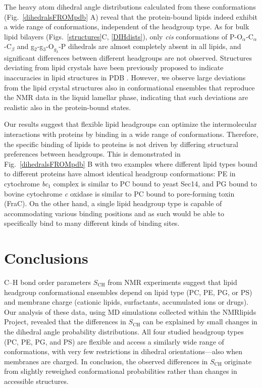 \documentclass[journal=jpcbfk,manuscript=article]{achemso}
\begin{document}
The heavy atom dihedral angle distributions calculated from these conformations 
(Fig.~\ref{dihedralsFROMpdb} A) reveal that the protein-bound lipids indeed exhibit a wide
range of conformations, independent of the headgroup type.
As for bulk lipid bilayers (Figs.~\ref{structures}C, \ref{DIHdists}), only {\it cis} conformations
of P-O$_\alpha$-C$_\alpha$-C$_\beta$ and g$_2$-g$_3$-O$_{g_3}$-P dihedrals are almost
completely absent in all lipids, and significant differences between
different headgroups are not observed.
Structures deviating from lipid crystals 
have been previously proposed to indicate inaccuracies in lipid structures in PDB \cite{marsh13b,pezeshkian18}. 
However, we observe large deviations from the lipid crystal structures also in conformational ensembles
that reproduce the NMR data in the liquid lamellar phase, indicating that such deviations
are realistic also in the protein-bound states.


Our results suggest that flexible lipid headgroups can optimize the intermolecular interactions with proteins by binding
in a wide range of conformations.
Therefore, the specific binding of lipids to proteins is not driven by differing structural preferences between headgroups.
This is demonstrated in Fig.~\ref{dihedralsFROMpdb} B with two examples where different lipid types bound to
different proteins have almost identical headgroup conformations:
PE in cytochrome {\it bc}$_1$ complex is similar to PC bound to yeast Sec14,
and PG bound to bovine cytochrome {\it c} oxidase is similar to PC bound to pore-forming toxin (FraC).
On the other hand, a single lipid headgroup type is capable of accommodating various binding positions and as such would 
be able to specifically bind to many different kinds of binding sites.


\section{Conclusions}

C--H bond order parameters $S_\mathrm{CH}$ from NMR experiments 
suggest that lipid headgroup conformational ensembles depend on lipid type (PC, PE, PG, or PS) 
and membrane charge (cationic lipids, surfactants, accumulated ions or drugs). 
Our analysis of these data, using MD simulations collected
within the NMRlipids Project,
revealed that the differences in $S_\mathrm{CH}$ can be explained
by small changes in the dihedral angle probability distributions.
All four studied headgroup types (PC, PE, PG, and PS) are flexible
and access a similarly wide range of conformations, with very few restrictions in dihedral orientations---also when membranes are charged.
In conclusion, the observed differences in $S_\mathrm{CH}$ originate from
slightly reweighed conformational probabilities rather than changes in accessible structures.
\end{document}
